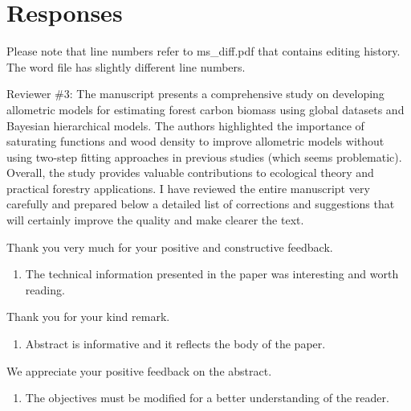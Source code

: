 \documentclass[
  12pt,
  letterpaper,
  DIV=11,
  numbers=noendperiod]{scrartcl}
\providecommand{\tightlist}{%
  \setlength{\itemsep}{0pt}\setlength{\parskip}{0pt}}\usepackage{longtable,booktabs,array}
\renewenvironment{quote}
  {\begin{customblockquote}\color{blockquote-text}\ignorespaces}
  {\end{customblockquote}}
\begin{document}
\newpage

\hypertarget{responses}{%
\section{Responses}\label{responses}}

Please note that line numbers refer to ms\_diff.pdf that contains
editing history. The word file has slightly different line numbers.

\begin{quote}
Reviewer \#3: The manuscript presents a comprehensive study on
developing allometric models for estimating forest carbon biomass using
global datasets and Bayesian hierarchical models. The authors
highlighted the importance of saturating functions and wood density to
improve allometric models without using two-step fitting approaches in
previous studies (which seems problematic). Overall, the study provides
valuable contributions to ecological theory and practical forestry
applications. I have reviewed the entire manuscript very carefully and
prepared below a detailed list of corrections and suggestions that will
certainly improve the quality and make clearer the text.
\end{quote}

Thank you very much for your positive and constructive feedback.

\begin{quote}
\begin{enumerate}
\def\labelenumi{\arabic{enumi})}
\tightlist
\item
  The technical information presented in the paper was interesting and
  worth reading.
\end{enumerate}
\end{quote}

Thank you for your kind remark.

\begin{quote}
\begin{enumerate}
\def\labelenumi{\arabic{enumi})}
\setcounter{enumi}{1}
\tightlist
\item
  Abstract is informative and it reflects the body of the paper.
\end{enumerate}
\end{quote}

We appreciate your positive feedback on the abstract.

\begin{quote}
\begin{enumerate}
\def\labelenumi{\arabic{enumi})}
\setcounter{enumi}{2}
\tightlist
\item
  The objectives must be modified for a better understanding of the
  reader.
\end{enumerate}
\end{quote}
\end{document}
